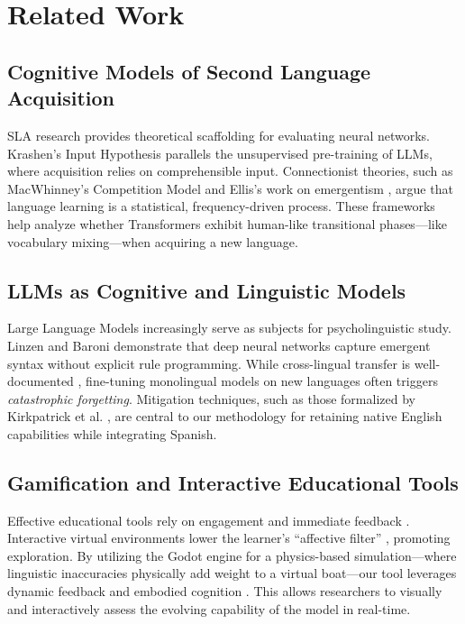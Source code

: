 \section{Related Work}
\label{sec:related_work}

\subsection{Cognitive Models of Second Language Acquisition}
SLA research provides theoretical scaffolding for evaluating neural networks. Krashen’s Input Hypothesis \cite{krashen1985input} parallels the unsupervised pre-training of LLMs, where acquisition relies on comprehensible input. Connectionist theories, such as MacWhinney’s Competition Model \cite{macwhinney2001competition} and Ellis’s work on emergentism \cite{ellis2002frequency}, argue that language learning is a statistical, frequency-driven process. These frameworks help analyze whether Transformers exhibit human-like transitional phases—like vocabulary mixing—when acquiring a new language.

\subsection{LLMs as Cognitive and Linguistic Models}
Large Language Models increasingly serve as subjects for psycholinguistic study. Linzen and Baroni \cite{linzen2021syntactic} demonstrate that deep neural networks capture emergent syntax without explicit rule programming. While cross-lingual transfer is well-documented \cite{conneau2019cross}, fine-tuning monolingual models on new languages often triggers \textit{catastrophic forgetting}. Mitigation techniques, such as those formalized by Kirkpatrick et al. \cite{kirkpatrick2017overcoming}, are central to our methodology for retaining native English capabilities while integrating Spanish.

\subsection{Gamification and Interactive Educational Tools}
Effective educational tools rely on engagement and immediate feedback \cite{plass2015foundations}. Interactive virtual environments lower the learner's ``affective filter'' \cite{godwin2014games}, promoting exploration. By utilizing the Godot engine for a physics-based simulation—where linguistic inaccuracies physically add weight to a virtual boat—our tool leverages dynamic feedback and embodied cognition \cite{kapp2012gamification}. This allows researchers to visually and interactively assess the evolving capability of the model in real-time.